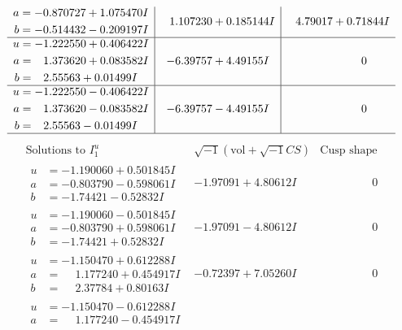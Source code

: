 \documentclass[1p]{elsarticle_modified}
\theoremstyle{definition}
\newcommand{\I}{\sqrt{-1}}
\begin{document}
$$\begin{array}{c|c|c}
\begin{aligned}
a &= -0.870727 + 1.075470 I \\
b &= -0.514432 - 0.209197 I\end{aligned}
 & \phantom{-}1.107230 + 0.185144 I & \phantom{-}4.79017 + 0.71844 I \\ \hline\begin{aligned}
u &= -1.222550 + 0.406422 I \\
a &= \phantom{-}1.373620 + 0.083582 I \\
b &= \phantom{-}2.55563 + 0.01499 I\end{aligned}
 & -6.39757 + 4.49155 I & \phantom{-0.000000 } 0 \\ \hline\begin{aligned}
u &= -1.222550 - 0.406422 I \\
a &= \phantom{-}1.373620 - 0.083582 I \\
b &= \phantom{-}2.55563 - 0.01499 I\end{aligned}
 & -6.39757 - 4.49155 I & \phantom{-0.000000 } 0\\
 \hline 
 \end{array}$$\newpage$$\begin{array}{c|c|c}  
\text{Solutions to }I^u_{1}& \I (\text{vol} + \sqrt{-1}CS) & \text{Cusp shape}\\
 \hline 
\begin{aligned}
u &= -1.190060 + 0.501845 I \\
a &= -0.803790 - 0.598061 I \\
b &= -1.74421 - 0.52832 I\end{aligned}
 & -1.97091 + 4.80612 I & \phantom{-0.000000 } 0 \\ \hline\begin{aligned}
u &= -1.190060 - 0.501845 I \\
a &= -0.803790 + 0.598061 I \\
b &= -1.74421 + 0.52832 I\end{aligned}
 & -1.97091 - 4.80612 I & \phantom{-0.000000 } 0 \\ \hline\begin{aligned}
u &= -1.150470 + 0.612288 I \\
a &= \phantom{-}1.177240 + 0.454917 I \\
b &= \phantom{-}2.37784 + 0.80163 I\end{aligned}
 & -0.72397 + 7.05260 I & \phantom{-0.000000 } 0 \\ \hline\begin{aligned}
u &= -1.150470 - 0.612288 I \\
a &= \phantom{-}1.177240 - 0.454917 I \\

\end{aligned}
\end{array}$$
\end{document}
